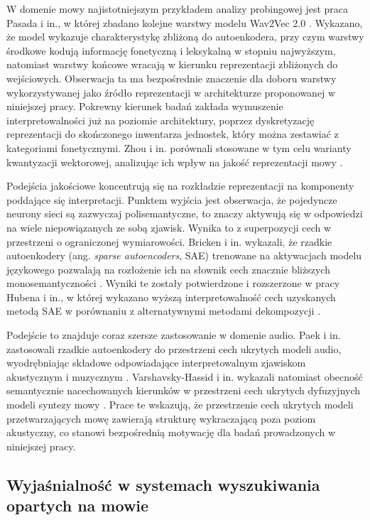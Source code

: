 W domenie mowy najistotniejszym przykładem analizy probingowej jest praca Pasada i in., w której zbadano kolejne warstwy modelu Wav2Vec 2.0 \cite{pasad2021layer}. Wykazano, że model wykazuje charakterystykę zbliżoną do autoenkodera, przy czym warstwy środkowe kodują informację fonetyczną i leksykalną w stopniu najwyższym, natomiast warstwy końcowe wracają w kierunku reprezentacji zbliżonych do wejściowych. Obserwacja ta ma bezpośrednie znaczenie dla doboru warstwy wykorzystywanej jako źródło reprezentacji w architekturze proponowanej w niniejszej pracy. Pokrewny kierunek badań zakłada wymuszenie interpretowalności już na poziomie architektury, poprzez dyskretyzację reprezentacji do skończonego inwentarza jednostek, który można zestawiać z kategoriami fonetycznymi. Zhou i in. porównali stosowane w tym celu warianty kwantyzacji wektorowej, analizując ich wpływ na jakość reprezentacji mowy \cite{Zhou2020ACO}.

Podejścia jakościowe koncentrują się na rozkładzie reprezentacji na komponenty poddające się interpretacji. Punktem wyjścia jest obserwacja, że pojedyncze neurony sieci są zazwyczaj polisemantyczne, to znaczy aktywują się w odpowiedzi na wiele niepowiązanych ze sobą zjawisk. Wynika to z superpozycji cech w przestrzeni o ograniczonej wymiarowości. Bricken i in. wykazali, że rzadkie autoenkodery (ang. \textit{sparse autoencoders}, SAE) trenowane na aktywacjach modelu językowego pozwalają na rozłożenie ich na słownik cech znacznie bliższych monosemantyczności \cite{bricken2023monosemanticity}. Wyniki te zostały potwierdzone i rozszerzone w pracy Hubena i in., w której wykazano wyższą interpretowalność cech uzyskanych metodą SAE w porównaniu z alternatywnymi metodami dekompozycji \cite{huben2024sparse}.

Podejście to znajduje coraz szersze zastosowanie w domenie audio. Paek i in. zastosowali rzadkie autoenkodery do przestrzeni cech ukrytych modeli audio, wyodrębniając składowe odpowiadające interpretowalnym zjawiskom akustycznym i muzycznym \cite{paek2025learninginterpretablefeaturesaudio}. Varshavsky-Hassid i in. wykazali natomiast obecność semantycznie nacechowanych kierunków w przestrzeni cech ukrytych dyfuzyjnych modeli syntezy mowy \cite{varshavskyhassid2024semanticlatentspacediffusionbased}. Prace te wskazują, że przestrzenie cech ukrytych modeli przetwarzających mowę zawierają strukturę wykraczającą poza poziom akustyczny, co stanowi bezpośrednią motywację dla badań prowadzonych w niniejszej pracy.

\subsection{Wyjaśnialność w systemach wyszukiwania opartych na mowie}

